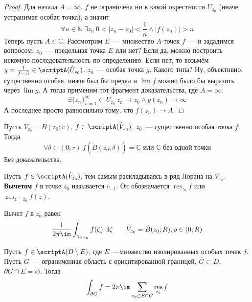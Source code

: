 \documentclass{article}
\begin{document}
    \begin{proof}
        Для начала $A=\infty$. $f$ не ограничена ни в какой окрестности $U_{z_0}$ (иначе устранимая особая точка), а значит
        $$
        \forall n\in\mathbb N~\exists z_n~0<|z_n-z_0|<\frac1n\land|f(z_n)|>n
        $$
        Теперь пусть $A\in\mathbb C$. Рассмотрим $E$~--- множество $A$-точек $f$~--- и зададимся вопросом: $z_0$~--- предельная точка $E$ или нет? Если да, можно построить искомую последовательность по определению. Если нет, то возьмём $g=\frac1{f-A}\in\scriptA(\dot U_{z_0})$. $z_0$~--- особая точка $g$. Какого типа? Ну, объективно, существенно особая, иначе был бы предел и $\lim f$ можно было бы выразить через $\lim g$. А тогда применим тот фрагмент доказательства, где $A=\infty$:
        $$
        \exists\{z_n\}_{n=1}^\infty\subset\dot U_{z_0}~z_n\to z_0\land g(z_n)\to\infty
        $$
        А последнее просто равносильно тому, что $f(z_n)\to A$.
    \end{proof}
    \begin{theorem}
        Пусть $V_{z_0}=B(z_0;r)$, $f\in\scriptA(\dot V_{z_0})$, $z_0$~--- существенно особая точка $f$. Тогда
        $$
        \forall\delta\in(0;r)~f(\dot B(z_0;\delta))=\mathbb C\text{ или }\mathbb C\text{ без одной точки}
        $$
        Без доказательства.
    \end{theorem}
    \begin{definition}
        Пусть $f\in\scriptA(\dot V_{z_0})$, тем самым раскладываясь в ряд Лорана на $\dot V_{z_0}$. \textbf{Вычетом} $f$ в точке $z_0$ называется $c_{-1}$. Он обозначается $\operatorname*{res}_{z_0}f$ или $\operatorname*{res}_{z=z_0}f(z)$.
    \end{definition}
    \begin{remark}
        Вычет $f$ в $z_0$ равен
        $$
        \frac1{2\pi\im}\int_{\gamma_{\rho,z_0}}f(\zeta)~\mathrm d\zeta\qquad \dot V_{z_0}=\dot B(z_0;R),\rho\in(0;R)
        $$
    \end{remark}
    \begin{theorem}
        \label{Теорема Коши о вычетах}
        Пусть $f\in\scriptA(D\setminus E)$, где $E$~---множество изолированных особых точек $f$. Пусть $G$~--- ограниченная область с ориентированной границей, $\overline G\subset D$, $\partial G\cap E=\varnothing$. Тогда
        $$
        \int_{\partial G}f=2\pi\im\sum\limits_{z_k\in E\cap G}\operatorname*{res}_{z_k}f
        $$
    \end{theorem}
\end{document}
